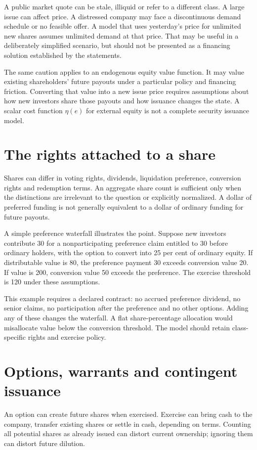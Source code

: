 A public market quote can be stale, illiquid or refer to a different class. A large issue can affect price. A distressed company may face a discontinuous demand schedule or no feasible offer. A model that uses yesterday's price for unlimited new shares assumes unlimited demand at that price. That may be useful in a deliberately simplified scenario, but should not be presented as a financing solution established by the statements.

The same caution applies to an endogenous equity value function. It may value existing shareholders' future payouts under a particular policy and financing friction. Converting that value into a new issue price requires assumptions about how new investors share those payouts and how issuance changes the state. A scalar cost function $\eta(e)$ for external equity is not a complete security issuance model.

\section{The rights attached to a share}
Shares can differ in voting rights, dividends, liquidation preference, conversion rights and redemption terms. An aggregate share count is sufficient only when the distinctions are irrelevant to the question or explicitly normalized. A dollar of preferred funding is not generally equivalent to a dollar of ordinary funding for future payouts.

A simple preference waterfall illustrates the point. Suppose new investors contribute 30 for a nonparticipating preference claim entitled to 30 before ordinary holders, with the option to convert into 25 per cent of ordinary equity. If distributable value is 80, the preference payment 30 exceeds conversion value 20. If value is 200, conversion value 50 exceeds the preference. The exercise threshold is 120 under these assumptions.

This example requires a declared contract: no accrued preference dividend, no senior claims, no participation after the preference and no other options. Adding any of these changes the waterfall. A flat share-percentage allocation would misallocate value below the conversion threshold. The model should retain class-specific rights and exercise policy.

\section{Options, warrants and contingent issuance}
An option can create future shares when exercised. Exercise can bring cash to the company, transfer existing shares or settle in cash, depending on terms. Counting all potential shares as already issued can distort current ownership; ignoring them can distort future dilution.

